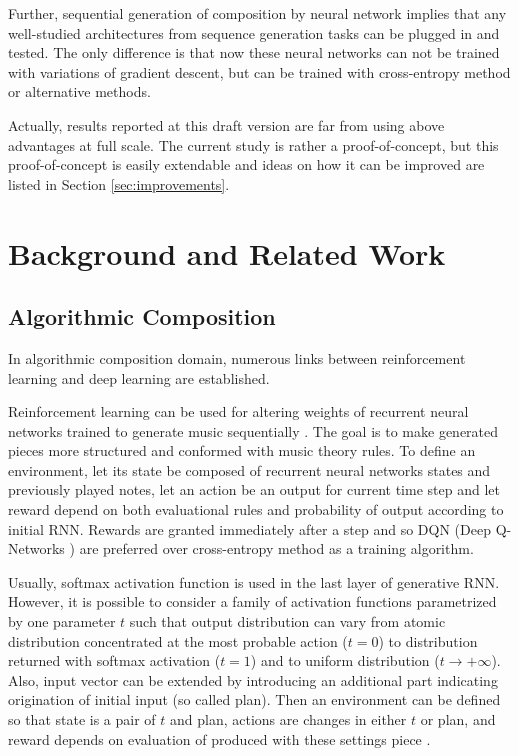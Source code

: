 \documentclass{article}
\begin{document}
Further, sequential generation of composition by neural network implies that any well-studied architectures from sequence generation tasks can be plugged in and tested. The only difference is that now these neural networks can not be trained with variations of gradient descent, but can be trained with cross-entropy method or alternative methods.

Actually, results reported at this draft version are far from using above advantages at full scale. The current study is rather a proof-of-concept, but this proof-of-concept is easily extendable and ideas on how it can be improved are listed in Section \ref{sec:improvements}.


\section{Background and Related Work}
\label{sec:literature}

\subsection{Algorithmic Composition}
\label{subsec:composition}

In algorithmic composition domain, numerous links between reinforcement learning and deep learning are established.

Reinforcement learning can be used for altering weights of recurrent neural networks trained to generate music sequentially \cite{jaques2016generating, kotecha2018bach}. The goal is to make generated pieces more structured and conformed with music theory rules. To define an environment, let its state be composed of recurrent neural networks states and previously played notes, let an action be an output for current time step and let reward depend on both evaluational rules and probability of output according to initial RNN. Rewards are granted immediately after a step and so DQN (Deep Q-Networks \cite{mnih2013playing}) are preferred over cross-entropy method as a training algorithm.

Usually, softmax activation function is used in the last layer of generative RNN. However, it is possible to consider a family of activation functions parametrized by one parameter $t$ such that output distribution can vary from atomic distribution concentrated at the most probable action ($t = 0$) to distribution returned with softmax activation ($t = 1$) and to uniform distribution ($t \to +\infty$). Also, input vector can be extended by introducing an additional part indicating origination of initial input (so called plan). Then an environment can be defined so that state is a pair of $t$ and plan, actions are changes in either $t$ or plan, and reward depends on evaluation of produced with these settings piece \cite{kumar2019polyphonic}.
\end{document}
